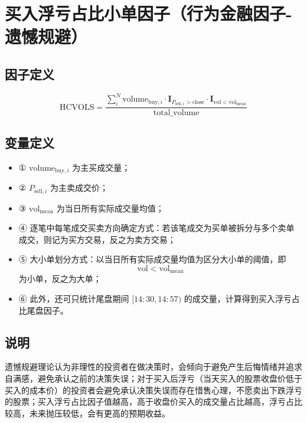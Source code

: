\documentclass{article}
\begin{document}
\section{买入浮亏占比小单因子（行为金融因子-遗憾规避）}

\subsection{因子定义}
\begin{equation}
    \mathrm{HCVOLS} = \frac{\sum_{i}^{N} \mathrm{volume}_{\mathrm{buy},i} \cdot \mathbf{I}_{P_{\mathrm{sell},i} > \mathrm{close}} \cdot \mathbf{I}_{\mathrm{vol} < \mathrm{vol}_{\mathrm{mean}}}}{\mathrm{total\_volume}}
\end{equation}

\subsection{变量定义}
\begin{itemize}
    \item ① \( \mathrm{volume}_{\mathrm{buy},i} \) 为主买成交量；
    \item ② \( P_{\mathrm{sell},i} \) 为主卖成交价；
    \item ③ \( \mathrm{vol}_{\mathrm{mean}} \) 为当日所有实际成交量均值；
    \item ④ 逐笔中每笔成交买卖方向确定方式：若该笔成交为买单被拆分与多个卖单成交，则记为买方交易，反之为卖方交易；
    \item ⑤ 大小单划分方式：以当日所有实际成交量均值为区分大小单的阈值，即
        \begin{equation*}
            \mathrm{vol} < \mathrm{vol}_{\mathrm{mean}}
        \end{equation*}
        为小单，反之为大单；
    \item ⑥ 此外，还可只统计尾盘期间 \([14:30,14:57)\) 的成交量，计算得到买入浮亏占比尾盘因子。
\end{itemize}

\subsection{说明}
遗憾规避理论认为非理性的投资者在做决策时，会倾向于避免产生后悔情绪并追求自满感，避免承认之前的决策失误；对于买入后浮亏（当天买入的股票收盘价低于买入的成本价）的投资者会避免承认决策失误而存在惜售心理，不愿卖出下跌浮亏的股票；买入浮亏占比因子值越高，高于收盘价买入的成交量占比越高，浮亏占比较高，未来抛压较低，会有更高的预期收益。
\end{document}
